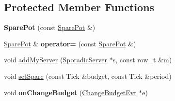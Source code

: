 \subsection*{Protected Member Functions}
\begin{DoxyCompactItemize}
\item 
{\bfseries Spare\+Pot} (const \hyperlink{classRTSim_1_1SparePot}{Spare\+Pot} \&)\hypertarget{classRTSim_1_1SparePot_ae5c1d0e85c7c3278cfa3aadbb05129a7}{}\label{classRTSim_1_1SparePot_ae5c1d0e85c7c3278cfa3aadbb05129a7}

\item 
\hyperlink{classRTSim_1_1SparePot}{Spare\+Pot} \& {\bfseries operator=} (const \hyperlink{classRTSim_1_1SparePot}{Spare\+Pot} \&)\hypertarget{classRTSim_1_1SparePot_af0a4109be50f3e9fce833f763b925dcd}{}\label{classRTSim_1_1SparePot_af0a4109be50f3e9fce833f763b925dcd}

\item 
void \hyperlink{classRTSim_1_1SparePot_a272529c0e94310bbd153296630406378}{add\+My\+Server} (\hyperlink{classRTSim_1_1SporadicServer}{Sporadic\+Server} $\ast$s, const row\+\_\+t \&m)
\item 
void \hyperlink{classRTSim_1_1SparePot_aef4bb9ec3b549e33ae202bd8958379dc}{set\+Spare} (const Tick \&budget, const Tick \&period)
\item 
void {\bfseries on\+Change\+Budget} (\hyperlink{classRTSim_1_1SparePot_1_1ChangeBudgetEvt}{Change\+Budget\+Evt} $\ast$e)\hypertarget{classRTSim_1_1SparePot_af47d24fd23637e69c8ce1d16f83aff40}{}\label{classRTSim_1_1SparePot_af47d24fd23637e69c8ce1d16f83aff40}

\end{DoxyCompactItemize}
